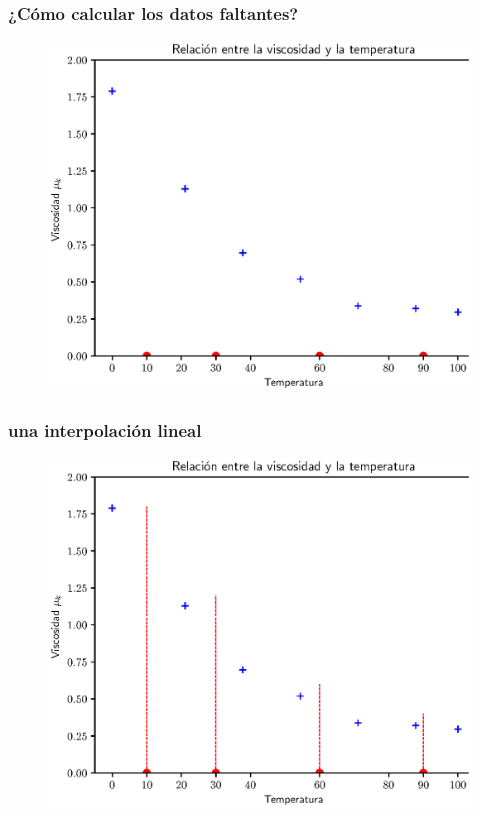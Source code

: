 \documentclass[12pt]{beamer}
\begin{document}
\begin{frame}
\frametitle{¿Cómo calcular los datos faltantes?}
\begin{figure}
    \centering
    \includegraphics[scale=0.575]{Imagenes/Intro_Interpolacion_02.eps}
\end{figure}
\end{frame}
\begin{frame}
\frametitle{una interpolación lineal}
\begin{figure}
    \centering
    \includegraphics[scale=0.575]{Imagenes/Intro_Interpolacion_03.eps}
\end{figure}
\end{frame}
\end{document}
